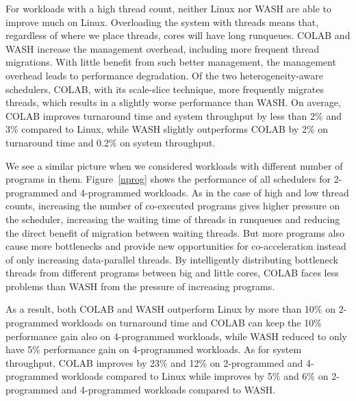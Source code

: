 For workloads with a high thread count, neither Linux nor WASH are able to improve much on Linux. Overloading the system with threads means that, regardless of where we place threads, cores will have long runqueues. COLAB and WASH increase the management overhead, including more frequent thread migrations. With little benefit from such better management, the management overhead leads to performance degradation. Of the two heterogeneity-aware schedulers, COLAB, with its scale-slice technique, more frequently migrates threads, which results in a slightly worse performance than WASH. On average, COLAB improves turnaround time and system throughput by less than 2\% and 3\% compared to Linux, while WASH slightly outperforms COLAB by 2\% on turnaround time and 0.2\% on system throughput.

We see a similar picture when we considered workloads with different number of programs in them. Figure~\ref{nprog} shows the performance of all schedulers for 2-programmed and 4-programmed workloads. As in the case of high and low thread counts, increasing the number of co-executed programs gives higher pressure on the scheduler, increasing the waiting time of threads in runqueues and reducing the direct benefit of migration between waiting threads. But more programs also cause more bottlenecks and provide new opportunities for co-acceleration instead of only increasing data-parallel threads. 
By intelligently distributing bottleneck threads from different programs between big and little cores, COLAB faces less problems than WASH from the pressure of increasing programs. 

As a result, both COLAB and WASH outperform Linux by more than 10\% on 2-programmed workloads on turnaround time and COLAB can keep the 10\% performance gain also on 4-programmed workloads, while WASH reduced to only have 5\% performance gain on 4-programmed workloads. As for system throughput, COLAB improves by 23\% and 12\% on 2-programmed and 4-programmed workloads compared to Linux while improves by 5\% and 6\% on 2-programmed and 4-programmed workloads compared to WASH. 


